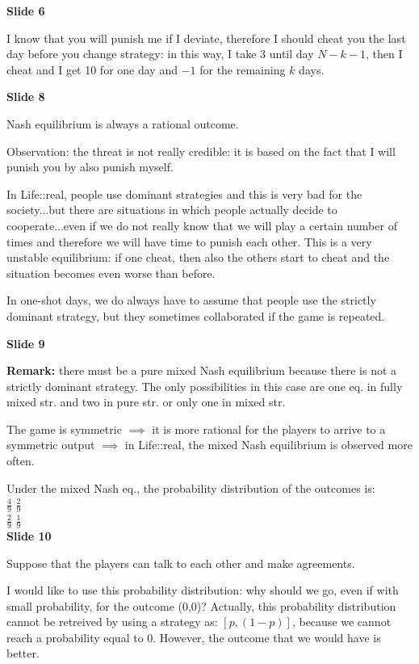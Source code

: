 \documentclass[pt11,a4paper,twoside,reqno,openright]{paper}
\begin{document}
\bigskip
\noindent \textbf{Slide 6}

\noindent I know that you will punish me if I deviate, therefore I should 
cheat you the last day before you change strategy: in this way, I take 3 
until day $N-k-1$, then I cheat and I get 10 for one day and $-1$ for the 
remaining $k$ days.

\bigskip
\noindent \textbf{Slide 8}

\noindent Nash equilibrium is always a rational outcome.

\noindent Observation: the threat is not really credible: %
it is based on the fact that I will punish you by also punish myself.

\noindent In Life::real, people use dominant strategies and this is very bad 
for the society...but there are situations in which people actually decide to 
cooperate...even if we do not really know that we will play a certain 
number of times and therefore we will have time to punish each other. This is 
a very unstable equilibrium: if one cheat, then also the others start to cheat 
and the situation becomes even worse than before.

\noindent In one-shot days, we do always have to assume that people use the 
strictly dominant strategy, but they sometimes collaborated if the game is 
repeated.

\bigskip
\noindent \textbf{Slide 9}

\noindent \textbf{Remark:} there must be a pure mixed Nash equilibrium because 
there is not a strictly dominant strategy. The only possibilities in this case 
are one eq. in fully mixed str. and two in pure str. or only one in mixed str.

\noindent The game is symmetric $\implies$ it is more rational for the 
players to arrive to a symmetric output $\implies$ in Life::real, the mixed 
Nash equilibrium is observed more often.

\noindent Under the mixed Nash eq., the probability distribution of the 
outcomes is:\\
$\frac{4}{9}$	$\frac{2}{9}$\\
$\frac{2}{9}$	$\frac{1}{9}$\\

\bigskip
\noindent \textbf{Slide 10}

\noindent Suppose that the players can talk to each other and make agreements.

\noindent I would like to use this probability distribution: why should we 
go, even if with small probability, for the outcome (0,0)? Actually, this 
probability distribution cannot be retreived by using a strategy as: 
$[p,(1-p)]$, because we cannot reach a probability equal to 0. However, the 
outcome that we would have is better.
\end{document}
